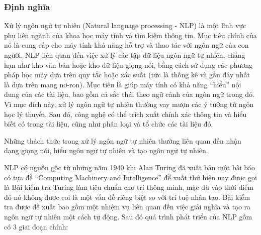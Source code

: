 \subsubsection{Định nghĩa}
Xử lý ngôn ngữ tự nhiên (Natural language processing - NLP) là một lĩnh vực phụ liên ngành của khoa học máy tính và tìm kiếm thông tin. Mục tiêu chính của nó là cung cấp cho máy tính khả năng hỗ trợ và thao tác với ngôn ngữ của con người. NLP liên quan đến việc xử lý các tập dữ liệu ngôn ngữ tự nhiên, chẳng hạn như kho văn bản hoặc kho dữ liệu giọng nói, bằng cách sử dụng các phương pháp học máy dựa trên quy tắc hoặc xác suất (tức là thống kê và gần đây nhất là dựa trên mạng nơ-ron). Mục tiêu là giúp máy tính có khả năng ``hiểu'' nội dung của các tài liệu, bao gồm cả sắc thái theo ngữ cảnh của ngôn ngữ trong đó. Vì mục đích này, xử lý ngôn ngữ tự nhiên thường vay mượn các ý tưởng từ ngôn học lý thuyết. Sau đó, công nghệ có thể trích xuất chính xác thông tin và hiểu biết có trong tài liệu, cũng như phân loại và tổ chức các tài liệu đó.

Những thách thức trong xử lý ngôn ngữ tự nhiên thường liên quan đến nhận dạng giọng nói, hiểu ngôn ngữ tự nhiên và tạo ngôn ngữ tự nhiên.

NLP có nguồn gốc từ những năm 1940 khi Alan Turing đã xuất bản một bài báo có tựa đề ``Computing Machinery and Intelligence'' đề xuất thứ hiện nay được gọi là Bài kiểm tra Turing làm tiêu chuẩn cho trí thông minh, mặc dù vào thời điểm đó nó không được coi là một vấn đề riêng biệt so với trí tuệ nhân tạo. Bài kiểm tra được đề xuất bao gồm một nhiệm vụ liên quan đến việc giải nghĩa và tạo ra ngôn ngữ tự nhiên một cách tự động. Sau đó quá trình phát triển của NLP gồm có 3 giai đoạn chính:

